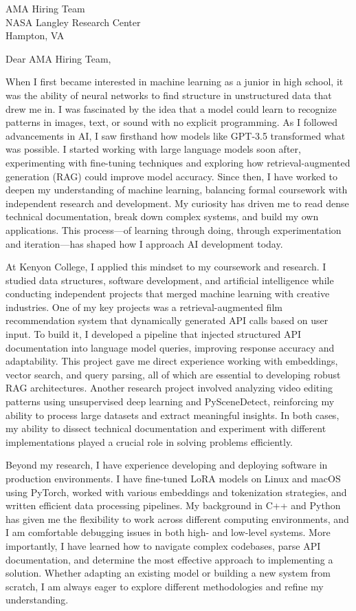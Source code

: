 \documentclass[a4paper,10pt]{letter}
\begin{document}
\begin{letter}{AMA Hiring Team \\
NASA Langley Research Center \\
Hampton, VA}

\opening{Dear AMA Hiring Team,}

When I first became interested in machine learning as a junior in high school, it was the ability of neural networks to find structure in unstructured data that drew me in. I was fascinated by the idea that a model could learn to recognize patterns in images, text, or sound with no explicit programming. As I followed advancements in AI, I saw firsthand how models like GPT-3.5 transformed what was possible. I started working with large language models soon after, experimenting with fine-tuning techniques and exploring how retrieval-augmented generation (RAG) could improve model accuracy. Since then, I have worked to deepen my understanding of machine learning, balancing formal coursework with independent research and development. My curiosity has driven me to read dense technical documentation, break down complex systems, and build my own applications. This process—of learning through doing, through experimentation and iteration—has shaped how I approach AI development today.

At Kenyon College, I applied this mindset to my coursework and research. I studied data structures, software development, and artificial intelligence while conducting independent projects that merged machine learning with creative industries. One of my key projects was a retrieval-augmented film recommendation system that dynamically generated API calls based on user input. To build it, I developed a pipeline that injected structured API documentation into language model queries, improving response accuracy and adaptability. This project gave me direct experience working with embeddings, vector search, and query parsing, all of which are essential to developing robust RAG architectures. Another research project involved analyzing video editing patterns using unsupervised deep learning and PySceneDetect, reinforcing my ability to process large datasets and extract meaningful insights. In both cases, my ability to dissect technical documentation and experiment with different implementations played a crucial role in solving problems efficiently.

Beyond my research, I have experience developing and deploying software in production environments. I have fine-tuned LoRA models on Linux and macOS using PyTorch, worked with various embeddings and tokenization strategies, and written efficient data processing pipelines. My background in C++ and Python has given me the flexibility to work across different computing environments, and I am comfortable debugging issues in both high- and low-level systems. More importantly, I have learned how to navigate complex codebases, parse API documentation, and determine the most effective approach to implementing a solution. Whether adapting an existing model or building a new system from scratch, I am always eager to explore different methodologies and refine my understanding.


\end{letter}
\end{document}
